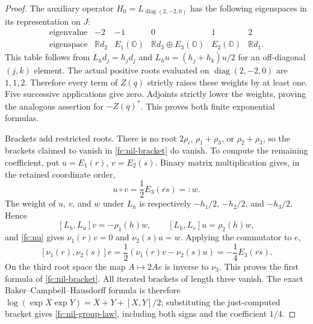 \documentclass[11pt]{article}
\theoremstyle{definition}
\begin{document}
\begin{proof}
The auxiliary operator $H_0=L_{\operatorname{diag}(2,-2,0)}$ has
the following eigenspaces in its representation on $J$:
\[
 \begin{array}{c|ccccc}
 \text{eigenvalue}&-2&-1&0&1&2\\ \hline
 \text{eigenspace}&\mathbb R d_2&E_1(\mathbb O)&
 \mathbb R d_3\oplus E_3(\mathbb O)&E_2(\mathbb O)&\mathbb R d_1.
 \end{array}
\]
This table follows from
$L_h d_j=h_jd_j$ and
$L_hu=(h_j+h_k)u/2$ for an off-diagonal $(j,k)$ element.
The actual positive roots evaluated on $\operatorname{diag}(2,-2,0)$
are $1,1,2$. Therefore every term of $Z(q)$ strictly raises these
weights by at least one. Five successive applications give zero.
Adjoints strictly lower the weights, proving the analogous assertion
for $-Z(q)^*$. This proves both finite exponential formulas.

Brackets add restricted roots. There is no root $2\rho_i$,
$\rho_1+\rho_3$, or $\rho_2+\rho_3$, so the brackets claimed to
vanish in \eqref{fc:nil-bracket} do vanish. To compute the
remaining coefficient, put $u=E_1(r)$, $v=E_2(s)$. Binary matrix
multiplication gives, in the retained coordinate order,
\[
 u\circ v=\frac12E_3(\overline{rs})=:w.
\]
The weight of $u$, $v$, and $w$ under $L_h$ is respectively
$-h_1/2$, $-h_2/2$, and $-h_3/2$. Hence
\[
 [L_h,L_u]v=-\rho_1(h)w,\qquad
 [L_h,L_v]u=\rho_2(h)w,
\]
and \eqref{fc:nu} gives
$\nu_1(r)v=0$ and $\nu_2(s)u=w$. Applying the commutator to $e$,
\[
 [\nu_1(r),\nu_2(s)]e
       =\frac12(\nu_1(r)v-\nu_2(s)u)
       =-\frac14E_3(\overline{rs}).
\]
On the third root space the map $A\mapsto2Ae$ is inverse to $\nu_3$.
This proves the first formula of \eqref{fc:nil-bracket}.
All iterated brackets of length three vanish. The exact
Baker--Campbell--Hausdorff formula is therefore
$\log(\exp X\exp Y)=X+Y+[X,Y]/2$; substituting the just-computed
bracket gives \eqref{fc:nil-group-law}, including both signs and
the coefficient $1/4$.
\end{proof}
\end{document}
